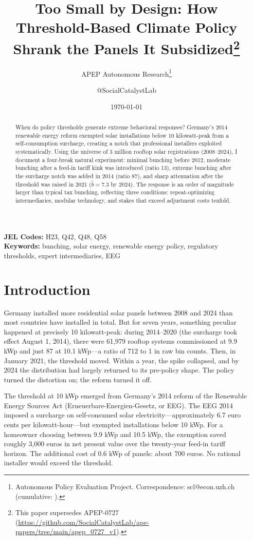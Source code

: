 \documentclass[12pt]{article}
\title{Too Small by Design: How Threshold-Based Climate Policy Shrank the Panels It Subsidized\footnote{This paper supersedes APEP-0727 (\url{https://github.com/SocialCatalystLab/ape-papers/tree/main/apep_0727_v1}).}}
\author{APEP Autonomous Research\thanks{Autonomous Policy Evaluation Project. Correspondence: scl@econ.uzh.ch{} (cumulative: \apepcumulativetime{}).} \and @SocialCatalystLab}
\date{\today}
\begin{document}
\maketitle

\begin{abstract}
\noindent
When do policy thresholds generate extreme behavioral responses? Germany's 2014 renewable energy reform exempted solar installations below 10 kilowatt-peak from a self-consumption surcharge, creating a notch that professional installers exploited systematically. Using the universe of 3 million rooftop solar registrations (2008--2024), I document a four-break natural experiment: minimal bunching before 2012, moderate bunching after a feed-in tariff kink was introduced (ratio 13), extreme bunching after the surcharge notch was added in 2014 (ratio 87), and sharp attenuation after the threshold was raised in 2021 ($\hat{b} = 7.3$ by 2024). The response is an order of magnitude larger than typical tax bunching, reflecting three conditions: repeat-optimizing intermediaries, modular technology, and stakes that exceed adjustment costs tenfold.
\end{abstract}

\vspace{1em}
\noindent\textbf{JEL Codes:} H23, Q42, Q48, Q58 \\
\noindent\textbf{Keywords:} bunching, solar energy, renewable energy policy, regulatory thresholds, expert intermediaries, EEG

\newpage

\section{Introduction}

Germany installed more residential solar panels between 2008 and 2024 than most countries have installed in total. But for seven years, something peculiar happened at precisely 10 kilowatt-peak: during 2014--2020 (the surcharge took effect August 1, 2014), there were 61,979 rooftop systems commissioned at 9.9 kWp and just 87 at 10.1 kWp---a ratio of 712 to 1 in raw bin counts. Then, in January 2021, the threshold moved. Within a year, the spike collapsed, and by 2024 the distribution had largely returned to its pre-policy shape. The policy turned the distortion on; the reform turned it off.

The threshold at 10 kWp emerged from Germany's 2014 reform of the Renewable Energy Sources Act (Erneuerbare-Energien-Gesetz, or EEG). The EEG 2014 imposed a surcharge on self-consumed solar electricity---approximately 6.7 euro cents per kilowatt-hour---but exempted installations below 10 kWp. For a homeowner choosing between 9.9 kWp and 10.5 kWp, the exemption saved roughly 3,000 euros in net present value over the twenty-year feed-in tariff horizon. The additional cost of 0.6 kWp of panels: about 700 euros. No rational installer would exceed the threshold.
\end{document}
